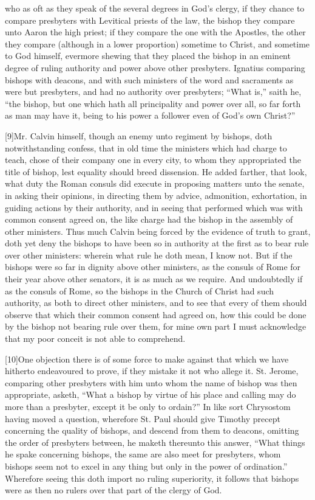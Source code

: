  who as oft as they speak of the several degrees in God’s clergy, if they chance to compare presbyters with Levitical priests of the law, the bishop they compare unto Aaron the high priest; if they compare the one with the Apostles, the other they compare (although in a lower proportion) sometime to Christ, and sometime to God himself, evermore shewing that they placed the bishop in an eminent degree of ruling authority and power above other presbyters. Ignatius comparing bishops with deacons, and with such ministers of the word and sacraments as were but presbyters, and had no authority over presbyters; “What is,” saith he, “the bishop, but one which hath all principality and power over all, so far forth as man may have it, being to his power a follower even of God’s own Christ?”

[9]Mr. Calvin himself, though an enemy unto regiment by bishops, doth notwithstanding confess, that in old time the ministers which had charge to teach, chose of their company one in every city, to whom they appropriated the title of bishop, lest equality should breed dissension. He added farther, that look, what duty the Roman consuls did execute in proposing matters unto the senate, in asking their opinions, in directing them by advice, admonition, exhortation, in guiding actions by their authority, and in seeing that performed which was with common consent agreed on, the like charge had the bishop in the assembly of other ministers. Thus much Calvin being forced by the evidence of truth to grant, doth  yet deny the bishops to have been so in authority at the first as to bear rule over other ministers:
 wherein what rule he doth mean, I know not. But if the bishops were so far in dignity above other ministers, as the consuls of Rome for their year above other senators, it is as much as we require. And undoubtedly if as the consuls of Rome, so the bishops in the Church of Christ had such authority, as both to direct other ministers, and to see that every of them should observe that which their common consent had agreed on, how this could be done by the bishop not bearing rule over them, for mine own part I must acknowledge that my poor conceit is not able to comprehend.

[10]One objection there is of some force to make against that which we have hitherto endeavoured to prove, if they mistake it not who allege it. St. Jerome, comparing other presbyters with him unto whom the name of bishop was then appropriate, asketh, “What a bishop by virtue of his place and calling may do more than a presbyter, except it be only to ordain?” In like sort Chrysostom having moved a question, wherefore St. Paul should give Timothy precept concerning the quality of bishops, and descend from them to deacons, omitting the order of presbyters between, he maketh thereunto this answer, “What things he spake concerning bishops, the same are also meet for presbyters, whom bishops seem not to excel in any thing but only in the power of ordination.” Wherefore seeing this doth import no ruling superiority, it follows that bishops were as then no rulers over that part of the clergy of God.

